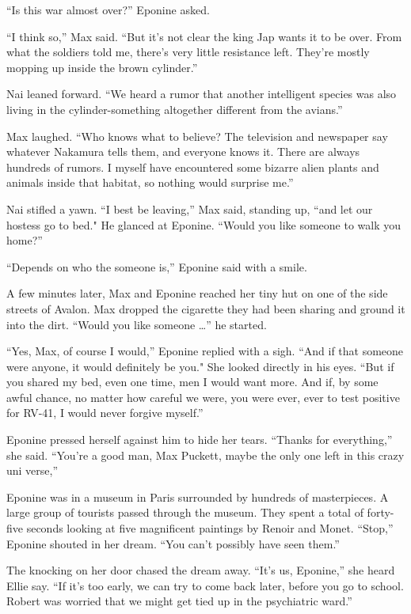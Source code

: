 \documentclass[]{article}
\begin{document}
{{“Is this war almost over?” Eponine asked.

“I think so,” Max said.  “But it’s not clear the king Jap wants it to be over.  From what the soldiers told me, there’s very little resistance left.  They’re mostly mopping up inside the brown cylinder.”

Nai leaned forward.  “We heard a rumor that another intelligent species was also living in the cylinder-something altogether different from the avians.”

Max laughed.  “Who knows what to believe? The television and newspaper say whatever Nakamura tells them, and everyone knows it.  There are always hundreds of rumors.  I myself have encountered some bizarre alien plants and animals inside that habitat, so nothing would surprise me.”

Nai stifled a yawn.  “I best be leaving,” Max said, standing up, “and let our hostess go to bed."  He glanced at Eponine.  “Would you like someone to walk you home?”

“Depends on who the someone is,” Eponine said with a smile.

A few minutes later, Max and Eponine reached her tiny hut on one of the side streets of Avalon.  Max dropped the cigarette they had been sharing and ground it into the dirt.  “Would you like someone …” he started.

“Yes, Max, of course I would,” Eponine replied with a sigh.  “And if that someone were anyone, it would definitely be you."  She looked directly in his eyes.  “But if you shared my bed, even one time, men I would want more.  And if, by some awful chance, no matter how careful we were, you were ever, ever to test positive for RV-41, I would never forgive myself.”

Eponine pressed herself against him to hide her tears.  “Thanks for everything,” she said.  “You’re a good man, Max Puckett, maybe the only one left in this crazy uni verse,”

Eponine was in a museum in Paris surrounded by hundreds of masterpieces.  A large group of tourists passed through the museum.  They spent a total of forty-five seconds looking at five magnificent paintings by Renoir and Monet.  “Stop,” Eponine shouted in her dream.  “You can’t possibly have seen them.”

The knocking on her door chased the dream away.  “It’s us, Eponine,” she heard Ellie say.  “If it’s too early, we can try to come back later, before you go to school.  Robert was worried that we might get tied up in the psychiatric ward.”

}}
\end{document}
